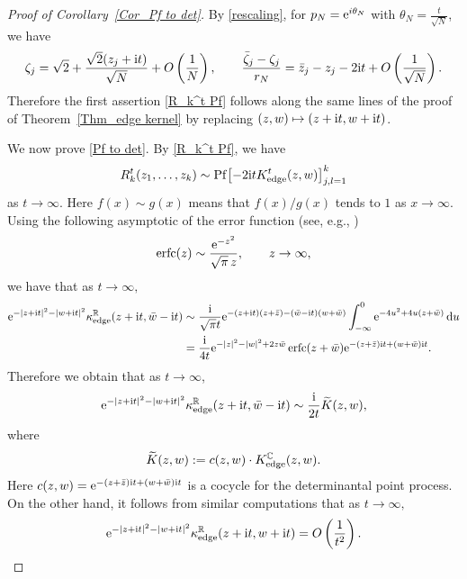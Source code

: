 \documentclass[pdftex]{sigma}
\numberwithin{equation}{section}
\newcommand{\erfc}{\operatorname{erfc}}
\newcommand{\R}{{\mathbb R}}
\newcommand{\C}{{\mathbb C}}
\newcommand{\1}{\chi}
\newcommand{\Pf}{{\operatorname{Pf}}}
\begin{document}
\begin{proof}[Proof of Corollary~\ref{Cor_Pf to det}]
	By \eqref{rescaling}, for $p_N={\rm e}^{i\theta_N}$ with $\theta_N=\frac{t}{\sqrt{N}}$, we have
	\begin{gather*}
		\zeta_j=\sqrt{2}+\frac{\sqrt{2}(z_j+{\rm i}t)}{\sqrt{N}}+O\left(\frac1N\right), \qquad 	\frac{\bar{\zeta}_j-\zeta_j}{r_N}	= \bar{z}_j-z_j-2{\rm i}t+O\left(\frac{1}{\sqrt{N}}\right).
	\end{gather*}
	Therefore the first assertion \eqref{R_k^t Pf} follows along the same lines of the proof of Theorem~\ref{Thm_edge kernel} by replacing $(z,w) \mapsto (z+{\rm i}t,w+{\rm i}t)$.
	
	We now prove \eqref{Pf to det}. By \eqref{R_k^t Pf}, we have
\begin{gather} \label{R_k^t Pf t asym}
		R_k^t(z_1,\dots, z_k) \sim \Pf \big[ {-}2{\rm i}tK_{{\rm edge}}^t(z,w) \big]_{ j,l=1 }^k
\end{gather}
	as $t \to \infty$.
 Here $f(x)\sim g(x)$ means that $f(x)/g(x)$ tends to $1$ as $x\to \infty$.
	Using the following asymptotic of the error function (see, e.g., \cite[equation~(7.12.1)]{olver2010nist})
	\begin{gather*}
	\erfc(z) \sim \frac{{\rm e}^{-z^2}}{\sqrt{\pi}\,z}, \qquad z\to\infty,
	\end{gather*}
	we have that as $t \to \infty,$
	\begin{align*}
		{\rm e}^{-|z+{\rm i}t|^2-|w+{\rm i}t|^2} \kappa_{{\rm edge}}^\R (z+{\rm i}t,\bar{w}-{\rm i}t)
		& \sim \frac{{\rm i}}{\sqrt{\pi}t} {\rm e}^{-(z+{\rm i}t)(z+\bar{z})-(\bar{w}-{\rm i}t)(w+\bar{w})} \int_{-\infty}^0 {\rm e}^{ -4u^2+4u(z+\bar{w}) } \, {\rm d}u
		\\
		&= \frac{{\rm i}}{4t} {\rm e}^{ -|z|^2-|w|^2+2z\bar{w} } \erfc(z+\bar{w}) {\rm e}^{ -(z+\bar{z}){\rm i}t+(w+\bar{w}){\rm i}t }.
	\end{align*}
	Therefore we obtain that as $t \to \infty$,
	\begin{gather} \label{kappa t lim 1}
		{\rm e}^{-|z+{\rm i}t|^2-|w+{\rm i}t|^2} \kappa_{{\rm edge}}^\R (z+{\rm i}t,\bar{w}-{\rm i}t) \sim \frac{{\rm i}}{2t}\widetilde{K}(z,w),
	\end{gather}
	where
	\begin{gather} \label{K tilde K edge C}
		\widetilde{K}(z,w):=c(z,w)\cdot K_{{\rm edge}}^\C(z,w) .
	\end{gather}
	Here $c(z,w)={\rm e}^{ -(z+\bar{z}){\rm i}t+(w+\bar{w}){\rm i}t }$ is a cocycle for the determinantal point process.
	On the other hand, it follows from similar computations that as $t \to \infty,$
	\begin{gather} \label{kappa t lim 2}
		{\rm e}^{-|z+{\rm i}t|^2-|w+{\rm i}t|^2} \kappa_{{\rm edge}}^\R (z+{\rm i}t,w+{\rm i}t)=O\left(\frac1{t^2}\right).
	\end{gather}
	

\end{proof}
\end{document}

